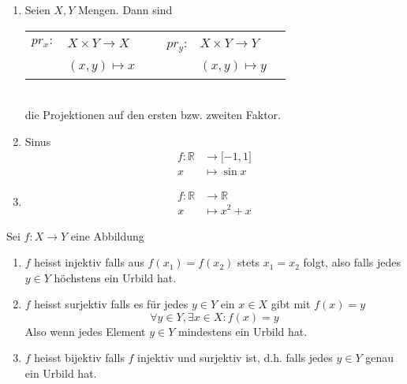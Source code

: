 \begin{enumerate}
\item Seien $X,Y$ Mengen. Dann sind \\
\begin{tabular}{r  l c r l c }
$pr_x:$ & $X\times Y\to X $& ~ & $pr_y$: & $X\times Y\to Y$ \\
~& $(x,y)\mapsto x$ & ~& ~& $(x,y)\mapsto y$ \\
\end{tabular}\\
die Projektionen auf den ersten bzw. zweiten Faktor. 
\item Sinus \begin{align*} f:\mathbb{R}&\to\lbrack -1,1\rbrack \\ x &\mapsto \sin x \end{align*}
\item \begin{align*}f:\mathbb{R}&\to\mathbb{R} \\ x&\mapsto x^2+x\end{align*}
\end{enumerate}
\begin{definition}{1.11}
Sei $f:X\to Y$ eine Abbildung
\begin{enumerate}
\item $f$ heisst injektiv falls aus $f(x_1)=f(x_2)$ stets $x_1=x_2$ folgt, also falls jedes $y\in Y$ höchstens ein Urbild hat.
\item $f$ heisst surjektiv falls es für jedes $y\in Y$ ein $x\in X$ gibt mit $f(x)=y$ \[\forall y\in Y, \exists x\in X:f(x)=y\] Also wenn jedes Element $y\in Y$ mindestens ein Urbild hat. 
\item $f$ heisst bijektiv falls $f$ injektiv und surjektiv ist, d.h. falls jedes $y\in Y$ genau ein Urbild hat. 
\end{enumerate}
\end{definition}

